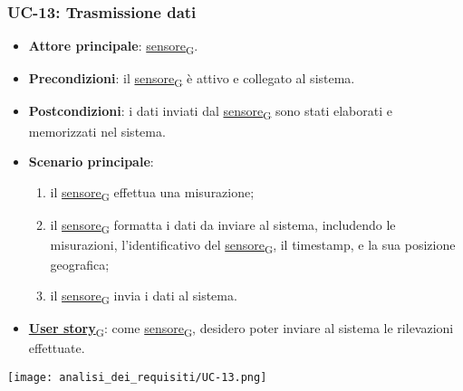 \subsubsection{UC-13: Trasmissione dati}
\begin{itemize}
	\item \textbf{Attore principale}: \href{https://7last.github.io/docs/pb/documentazione-interna/glossario\#sensore}{sensore\textsubscript{G}}.
	\item \textbf{Precondizioni}: il \href{https://7last.github.io/docs/pb/documentazione-interna/glossario\#sensore}{sensore\textsubscript{G}} è attivo e collegato al sistema.
	\item \textbf{Postcondizioni}: i dati inviati dal \href{https://7last.github.io/docs/pb/documentazione-interna/glossario\#sensore}{sensore\textsubscript{G}} sono stati elaborati e memorizzati nel sistema.
	\item \textbf{Scenario principale}:
	      \begin{enumerate}
		      \item il \href{https://7last.github.io/docs/pb/documentazione-interna/glossario\#sensore}{sensore\textsubscript{G}} effettua una misurazione;
		      \item il \href{https://7last.github.io/docs/pb/documentazione-interna/glossario\#sensore}{sensore\textsubscript{G}} formatta i dati da inviare al sistema, includendo le misurazioni, l'identificativo del \href{https://7last.github.io/docs/pb/documentazione-interna/glossario\#sensore}{sensore\textsubscript{G}}, il timestamp, e la sua posizione geografica;
		      \item il \href{https://7last.github.io/docs/pb/documentazione-interna/glossario\#sensore}{sensore\textsubscript{G}} invia i dati al sistema.
	      \end{enumerate}
	\item \href{https://7last.github.io/docs/pb/documentazione-interna/glossario\#user-story}{\textbf{User story}\textsubscript{G}}: come \href{https://7last.github.io/docs/pb/documentazione-interna/glossario\#sensore}{sensore\textsubscript{G}}, desidero poter inviare al sistema le rilevazioni effettuate.
\end{itemize}

\begin{center}
	\texttt{[image: analisi\_dei\_requisiti/UC-13.png]}
\end{center}

